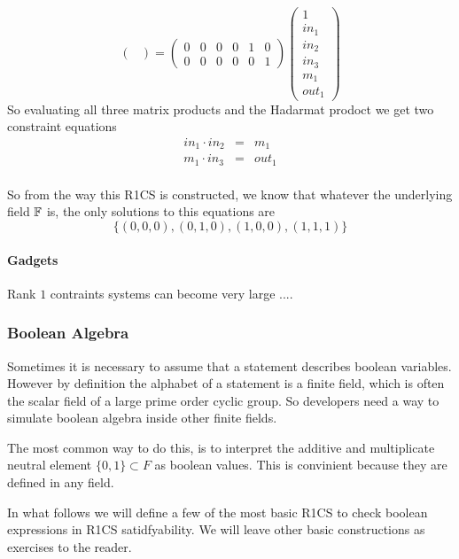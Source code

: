\begin{example}
$$\begin{pmatrix}
\end{pmatrix} =
\begin{pmatrix}
0 & 0 & 0 & 0 & 1 & 0 \\ 
0 & 0 & 0 & 0 & 0 & 1
\end{pmatrix} 
\begin{pmatrix}
1\\ in_1 \\ in_2 \\ in_3 \\ m_1 \\ out_1 
\end{pmatrix}
$$
So evaluating all three matrix products and the Hadarmat prodoct we get two constraint equations
$$
\begin{array}{rcl}
in_1 \cdot in_2  &= & m_1 \\
m_1 \cdot in_3  &= & out_1 \\
\end{array}
$$
\end{example}
So from the way this R1CS is constructed, we know that whatever the underlying field $\mathbb{F}$ is, the only solutions to this equations are
$$
\{(0,0,0), (0,1,0), (1,0,0), (1,1,1)\}
$$
\paragraph{Gadgets}
Rank $1$ contraints systems can become very large ....

\subsubsection{Boolean Algebra} 

Sometimes it is necessary to assume that a statement describes boolean variables. However by definition the alphabet of a statement is a finite field, which is often the scalar field of a large prime order cyclic group. So developers need a way to simulate boolean algebra inside other finite fields.

The most common way to do this, is to interpret the additive and multiplicate neutral element $\{0,1\}\subset F$ as boolean values. This is convinient because they are defined in any field. 

In what follows we will define a few of the most basic R1CS to check boolean expressions in R1CS satidfyability. We will leave other basic constructions as exercises to the reader. 

